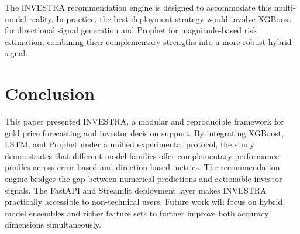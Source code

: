 \documentclass[journal,comsoc]{IEEEtran}
\begin{document}
The INVESTRA recommendation engine is designed to accommodate this multi-model reality. In practice, the best deployment strategy would involve XGBoost for directional signal generation and Prophet for magnitude-based risk estimation, combining their complementary strengths into a more robust hybrid signal.

\section{Conclusion}

This paper presented INVESTRA, a modular and reproducible framework for gold price forecasting and investor decision support. By integrating XGBoost, LSTM, and Prophet under a unified experimental protocol, the study demonstrates that different model families offer complementary performance profiles across error-based and direction-based metrics. The recommendation engine bridges the gap between numerical predictions and actionable investor signals. The FastAPI and Streamlit deployment layer makes INVESTRA practically accessible to non-technical users. Future work will focus on hybrid model ensembles and richer feature sets to further improve both accuracy dimensions simultaneously.



\end{document}
